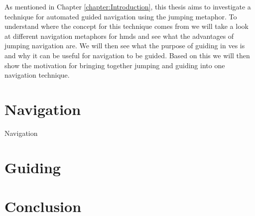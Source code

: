 \label{chapter:Related Work}
As mentioned in Chapter \ref{chapter:Introduction}, this thesis aims to investigate a technique for automated guided navigation using the jumping metaphor. To understand where the concept for this technique comes from we will take a look at different navigation metaphors for \acrshort{hmd}s and see what the advantages of jumping navigation are. We will then see what the purpose of guiding in \acrshort{ve}s is and why it can be useful for navigation to be guided. Based on this we will then show the motivation for bringing together jumping and guiding into one navigation technique. 

\section{Navigation}
\label{section:RW Navigation}
Navigation 

\section{Guiding}
\label{section:RW Guiding}
\section{Conclusion}
\label{section:RW Conclusion}
